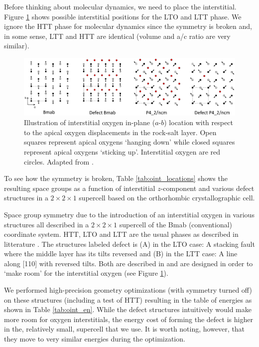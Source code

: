 Before thinking about molecular dynamics, we need to place the interstitial. Figure \ref{fig:oint_location} shows possible interstitial positions for the LTO and LTT phase. We ignore the HTT phase for molecular dynamics since the symmetry is broken and, in some sense, LTT and HTT are identical (volume and a/c ratio are very similar).

\begin{figure}
    \centering
    \includegraphics[width=\textwidth]{fig/md/oint.png}
    \caption[Illustration of interstitial positions]{Illustration of interstitial oxygen in-plane ($a$-$b$) location with respect to the apical oxygen displacements in the rock-salt layer. Open squares represent apical oxygens `hanging down' while closed squares represent apical oxygens `sticking up'. Interstitial oxygen are red circles. Adapted from \cite{Tranquada1995}.}
    \label{fig:oint_location}
\end{figure}

To see how the symmetry is broken, Table \ref{tab:oint_locations} shows the resulting space groups as a function of interstitial $z$-component and various defect structures in a $2 \times 2 \times 1$ supercell based on the orthorhombic crystallographic cell. 

\begin{table}[b]
    \centering
    
    \caption[Oxygen interstitial phases]{Space group symmetry due to the introduction of an interstitial oxygen in various structures all described in a $2 \times 2 \times 1$ supercell of the Bmab (conventional) coordinate system. HTT, LTO and LTT are the usual phases as described in litterature \cite{Hucker2012}. The structures labeled defect is (A) in the LTO case: A stacking fault where the middle layer has its tilts reversed and (B) in the LTT case: A line along [110] with reversed tilts. Both are described in \cite{Tranquada1994} and are designed in order to `make room' for the interstitial oxygen (see Figure \ref{fig:oint_location}).}
    \label{tab:oint_locations}
\end{table}

We performed high-precision geometry optimizations (with symmetry turned off) on these structures (including a test of HTT) resulting in the table of energies as shown in Table \ref{tab:oint_en}. While the defect structures intuitively would make more room for oxygen interstitials, the energy cost of forming the defect is higher in the, relatively small, supercell that we use. It is worth noting, however, that they move to very similar energies during the optimization.



